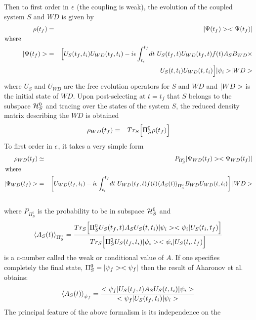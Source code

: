 Then to first order in $\mbox{$ \epsilon $}$ (the coupling is weak), the evolution of the
coupled
system $S$ and $WD$ is given by
 \begin{eqnarray}
\rho(t_f)& =&\mbox{$ \vert \Psi (t_f) > $}\mbox{$ < \Psi(t_f) \vert $}\nonumber\\
\mbox{where}\quad \quad \quad\quad&&\nonumber\\
\mbox{$ \vert \Psi(t_f) > $}& =& \Bigl [
U_S(t_f,t_i)U_{WD}(t_f,t_i) - i\mbox{$ \epsilon $} \int_{t_i}^{t_f}\! dt \
 U_S(t_f,t)U_{WD}(t_f,t)  f(t) A_S B_{WD}\times \Bigr. \nonumber\\
&& \quad \quad \Bigl.
  U_S(t,t_i)U_{WD}(t,t_i) \Bigr] \mbox{$ \mbox{$ \vert \psi_i > $} $} \mbox{$ \vert WD > $}
\label{weakiii}
 \end{eqnarray}
where $U_S$ and $U_{WD}$ are
the free evolution operators for $S$ and  $WD$ and  $\mbox{$ \vert WD > $}$ is the initial
state of  $WD$. Upon post-selecting at $t=t_f$ that $S$ belongs to the
subspace ${\cal H}_S^{0}$ and tracing over the  states of the
system $S$, the reduced density matrix describing the $WD$ is obtained
\begin{eqnarray}
 \rho_{WD}(t_f) &=& Tr_S
 \Bigl [ \Pi_S^0 \rho(t_f)
\Bigr]\end{eqnarray}
To first order in $\mbox{$ \epsilon $}$, it takes a very simple
form \begin{eqnarray}
 \rho_{WD}(t_f)&\simeq &
P_{\Pi_S^{0}}\mbox{$ \vert \Psi_{WD}(t_f) > $}
\mbox{$ < \Psi_{WD}(t_f) \vert $}\nonumber\\
\mbox{where}\quad \  \ \quad&&\nonumber\\
\mbox{$ \vert \Psi_{WD}(t_f) > $}&=&
\left[ U_{WD}(t_f,t_i) -
 i\mbox{$ \epsilon $}
\int_{t_i}^{t_f}\! dt \ U_{WD}(t_f,t)  f(t) \mbox{$ \langle A_{S}(t) \rangle $}_{\Pi_S^{0}}
B_{WD}U_{WD}(t,t_i)
 \right] \mbox{$ \vert WD > $}\nonumber\\
&&\label{weakiv}
 \end{eqnarray}
where $P_{\Pi_S^{0}}$ is the probability to be in subspace ${\cal H}_S^{0}$
and
  \begin{equation}
\mbox{$ \langle A_{S}(t) \rangle $}_{\Pi_S^{0}} = {Tr_S
\Bigl [ \Pi_S^{0} U_S(t_f,t) A_S U_S(t,t_i) \mbox{$ \mbox{$ \vert \psi_i > $} $}\mbox{$ \mbox{$ < \psi_i \vert $} $} U_S(t_i,t_f) \Bigr]
\over Tr_S \Bigl [ \Pi_S^{0} U_S(t_f,t_i)\mbox{$ \mbox{$ \vert \psi_i > $} $}\mbox{$ \mbox{$ < \psi_i \vert $} $} U_S(t_i,t_f) \Bigr]}
\label{weakv}
\end{equation}
 is a c-number called  the weak or conditional value of $A$. If
one specifies completely the final state, $\Pi_S^{0} =
\mbox{$ \vert \psi_f > $}\mbox{$ < \psi_f \vert $}$  then
the result of Aharonov et al.
obtains:
\begin{equation}
\mbox{$ \langle A_{S}(t) \rangle $}_{\psi_f} = {\mbox{$ < \psi_f \vert $}
U_S(t_f,t) A_S U_S(t,t_i) \mbox{$ \mbox{$ \vert \psi_i > $} $}  \over \mbox{$ < \psi_f \vert $} U_S(t_f,t_i) \mbox{$ \mbox{$ \vert \psi_i > $} $}}
\label{weakvi}
 \end{equation}
The principal feature of the above formalism is its independence on the

